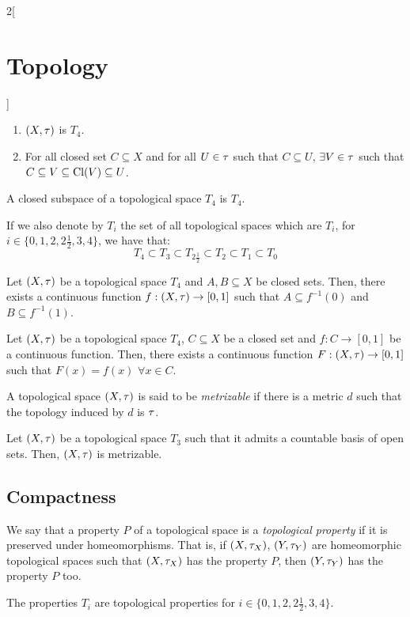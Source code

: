 \documentclass[../../../main.tex]{subfiles}
\begin{document}
\begin{multicols}{2}[\section{Topology}]
\begin{theorem}
    \begin{enumerate}
      \item $(X,\tau)$ is $T_4$.
      \item For all closed set $C\subseteq X$ and for all $U\in\tau$ such that $C\subseteq U$, $\exists V\in\tau$ such that $C\subseteq V\subseteq\operatorname{Cl}(V)\subseteq U$.
    \end{enumerate}
  \end{theorem}
  \begin{theorem}
    A closed subspace of a topological space $T_4$ is $T_4$.
  \end{theorem}
  \begin{theorem}
    If we also denote by $T_i$ the set of all topological spaces which are $T_i$, for $i\in\{0,1,2,2\frac{1}{2},3,4\}$, we have that: $$T_4\subset T_3\subset T_{2\frac{1}{2}}\subset T_2\subset T_1\subset T_0$$
  \end{theorem}
  \begin{lemma}
    Let $(X,\tau)$ be a topological space $T_4$ and $A,B\subseteq X$ be closed sets. Then, there exists a continuous function $f:(X,\tau)\rightarrow[0,1]$ such that $A\subseteq f^{-1}(0)$ and $B\subseteq f^{-1}(1)$.
  \end{lemma}
  \begin{theorem}
    Let $(X,\tau)$ be a topological space $T_4$, $C\subseteq X$ be a closed set and $f:C\rightarrow[0,1]$ be a continuous function. Then, there exists a continuous function $F:(X,\tau)\rightarrow[0,1]$ such that $F(x)=f(x)$ $\forall x\in C$.
  \end{theorem}
  \begin{definition}
    A topological space $(X,\tau)$ is said to be \emph{metrizable} if there is a metric $d$ such that the topology induced by $d$ is $\tau$.
  \end{definition}
  \begin{theorem}
    Let $(X,\tau)$ be a topological space $T_3$ such that it admits a countable basis of open sets. Then, $(X,\tau)$ is metrizable.
  \end{theorem}
  \subsection{Compactness}
  \begin{definition}
    We say that a property $P$ of a topological space is a \emph{topological property} if it is preserved under homeomorphisms. That is, if $(X,\tau_X)$, $(Y,\tau_Y)$ are homeomorphic topological spaces such that $(X,\tau_X)$ has the property $P$, then $(Y,\tau_Y)$ has the property $P$ too.
  \end{definition}
  \begin{prop}
    The properties $T_i$ are topological properties for $i\in\{0,1, 2, 2\frac{1}{2}, 3, 4\}$.
  \end{prop}

\end{multicols}
\end{document}
